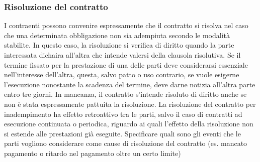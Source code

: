 \subsubsection{Risoluzione del contratto}
I contraenti possono convenire espressamente che il contratto si risolva nel caso che una determinata obbligazione non sia adempiuta secondo le modalità stabilite.
In questo caso, la risoluzione si verifica di diritto quando la parte interessata dichaira all'altra che intende valersi della clausola risolutiva.
Se il termine fissato per la prestazione di una delle parti deve considerarsi essenziale nell'interesse dell'altra, questa, salvo patto o uso contrario,
se vuole esigerne l'esecuzione nonostante la scadenza del termine, deve darne notizia all'altra parte entro tre giorni. In mancanza, il contratto s'intende
risoluto di diritto anche se non è stata espressamente pattuita la risoluzione.\newline
La risoluzione del contratto per inadempimento ha effetto retroattivo tra le parti, salvo il caso di contratti ad esecuzione continuata o periodica,
riguardo ai quali l'effetto della risoluzione non si estende alle prestazioni già eseguite.\newline
Specificare quali sono gli eventi che le parti vogliono considerare come cause di risoluzione del contratto (es. mancato pagamento o ritardo nel pagamento oltre un certo limite)
